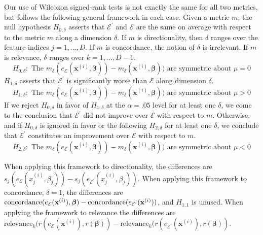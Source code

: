 \documentclass[mnsc,blindrev]{informs3}
\newcommand{\bx}{\mathbf{x}}
\newcommand{\mE}{\mathcal{E}}
\begin{document}
            Our use of Wilcoxon signed-rank tests is not exactly the same for all two metrics, but follows the following general framework in each case.
            Given a metric $m$, the null hypothesis $H_{0,\delta}$ asserts that $\mE^\prime$ and $\mE$ are the same on average with respect to the metric $m$ along a dimension $\delta$. If $m$ is directionality, then $\delta$ ranges over the feature indices $j=1,\ldots,D$. If $m$ is concordance, the notion of $\delta$ is irrelevant. If $m$ is relevance, $\delta$ ranges over $k=1,\ldots,D-1$.
            \begin{equation*}
                H_{0,\delta}: \text{ The } m_\delta(e_\mE(\bx^{(i)},\boldsymbol{\beta})) - m_\delta(\bx^{(i)},\boldsymbol{\beta})) \text{ are symmetric about } \mu = 0
            \end{equation*}
            $H_{1,\delta}$ asserts that $\mE^\prime$ is significantly worse than $\mE$ along dimension $\delta$. 
            \begin{equation*}
                H_{1,\delta}: \text{ The } m_\delta(e_\mE(\bx^{(i)},\boldsymbol{\beta})) - m_\delta(\bx^{(i)},\boldsymbol{\beta})) \text{ are symmetric about } \mu > 0
            \end{equation*}
            If we reject $H_{0,\delta}$ in favor of $H_{1,\delta}$ at the $\alpha=.05$ level for at least one $\delta$, we come to the conclusion that $\mE^{\prime}$ did not improve over $\mE$ with respect to $m$. Otherwise, and if $H_{0,\delta}$ is ignored in favor or the following $H_{2,\delta}$ for at least one $\delta$, we conclude that $\mE^{\prime}$ constitutes an improvement over $\mE$ with respect to $m$.
            \begin{equation*}
                H_{2,\delta}: \text{ The }  m_\delta(e_\mE(\bx^{(i)},\boldsymbol{\beta})) - m_\delta(\bx^{(i)},\boldsymbol{\beta})) \text{ are symmetric about } \mu< 0
            \end{equation*}            
            
            When applying this framework to directionality, the differences are $s_j(e_\mE(x_j^{(i)},\beta_j)) - s_j(e_{\mE^\prime}(x_j^{(i)},\beta_j))$. When applying this framework to concordance, $\delta=1$, the differences are $\text{\text{concordance}}(e_\mE(\mathbf{x}^{(i)}),\boldsymbol{\beta}) - \text{\text{concordance}}(e_{\mE^\prime}(\mathbf{x}^{(i)}))$, and $H_{1,1}$ is unused. When applying the framework to relevance the differences are $\text{relevance}_k(r(e_\mE(\mathbf{x}^{(i)}), r(\boldsymbol{\beta})) - \text{relevance}_k(r(e_{\mE^\prime}(\mathbf{x}^{(i)}), r(\boldsymbol{\beta}))$.
            
\end{document}
